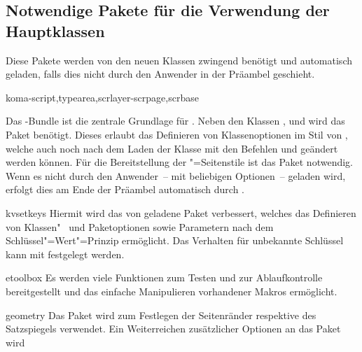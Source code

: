 \subsection{Notwendige Pakete für die Verwendung der Hauptklassen}
Diese Pakete werden von den neuen Klassen zwingend benötigt und automatisch 
geladen, falls dies nicht durch den Anwender in der Präambel geschieht.
%
\begin{packages}
\item[koma-script,typearea,scrlayer-scrpage,scrbase]
  \begin{Declaration*}{}
  \begin{Declaration*}{}
  \begin{Declaration*}{}
  \begin{Declaration*}{}
  Das \KOMAScript-Bundle ist die zentrale Grundlage für \TUDScript. Neben den 
  Klassen ,  und  wird das Paket 
   benötigt. Dieses erlaubt das Definieren von Klassenoptionen 
  im Stil von \KOMAScript, welche auch noch nach dem Laden der Klasse mit den 
  Befehlen  und  geändert werden können. Für 
  die Bereitstellung der "=Seitenstile ist das Paket 
   notwendig. Wenn es nicht durch den Anwender~-- mit 
  beliebigen Optionen~-- geladen wird, erfolgt dies am Ende der Präambel 
  automatisch durch \TUDScript.
  \end{Declaration*}
  \end{Declaration*}
  \end{Declaration*}
  \end{Declaration*}
\item[kvsetkeys]
  Hiermit wird das von  geladene Paket  
  verbessert, welches das Definieren von Klassen"~ und Paketoptionen sowie 
  Parametern nach dem Schlüssel"=Wert"=Prinzip ermöglicht. Das Verhalten für 
  unbekannte Schlüssel  kann mit  festgelegt werden.
\item[etoolbox]
  Es werden viele Funktionen zum Testen und zur Ablaufkontrolle bereitgestellt 
  und das einfache Manipulieren vorhandener Makros ermöglicht.
\item[geometry]
  Das Paket wird zum Festlegen der Seitenränder respektive des Satzspiegels 
  verwendet. Ein Weiterreichen zusätzlicher Optionen an das Paket wird 

\end{packages}
